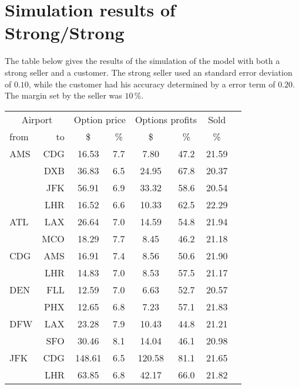 \chapter{Simulation results of Strong/Strong}
\label{app:SimulationResultsStrongStrong}
The table below gives the results of the simulation of the model with both a strong seller and a customer. The strong seller used an standard error deviation of $0.10$, while the customer had his accuracy determined by a error term of $0.20$. The margin set by the seller was $10\,\%$.
\\[2em]
\begin{table}[h]
    \small
    \begin{center}
        \begin{tabular}{l r c c c c c c}
            \toprule
            \multicolumn{2}{c}{Airport}  & \multicolumn{2}{c}{Option price} & \multicolumn{2}{c}{Options profits}  &  Sold  \\[.4ex]
            from  &  to  &  \$  & \%  &  \$  & \%  & \%  \\
            \midrule
AMS  &  CDG &   16.53  &     7.7  &    7.80  &    47.2  &   21.59  \\
     &  DXB &   36.83  &     6.5  &   24.95  &    67.8  &   20.37  \\
     &  JFK &   56.91  &     6.9  &   33.32  &    58.6  &   20.54  \\
     &  LHR &   16.52  &     6.6  &   10.33  &    62.5  &   22.29  \\[.5ex]
ATL  &  LAX &   26.64  &     7.0  &   14.59  &    54.8  &   21.94  \\
     &  MCO &   18.29  &     7.7  &    8.45  &    46.2  &   21.18  \\[.5ex]
CDG  &  AMS &   16.91  &     7.4  &    8.56  &    50.6  &   21.90  \\
     &  LHR &   14.83  &     7.0  &    8.53  &    57.5  &   21.17  \\[.5ex]
DEN  &  FLL &   12.59  &     7.0  &    6.63  &    52.7  &   20.57  \\
     &  PHX &   12.65  &     6.8  &    7.23  &    57.1  &   21.83  \\[.5ex]
DFW  &  LAX &   23.28  &     7.9  &   10.43  &    44.8  &   21.21  \\
     &  SFO &   30.46  &     8.1  &   14.04  &    46.1  &   20.98  \\[.5ex]
JFK  &  CDG &  148.61  &     6.5  &  120.58  &    81.1  &   21.65  \\
     &  LHR &   63.85  &     6.8  &   42.17  &    66.0  &   21.82  \\[.5ex]

\end{tabular}
\end{center}
\end{table}
